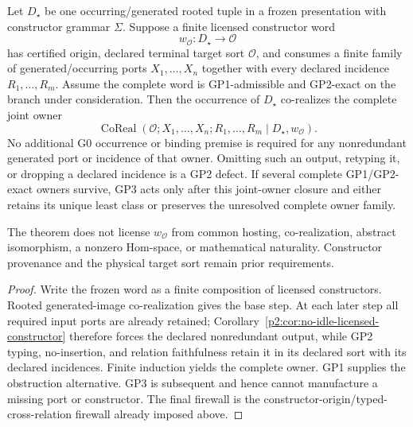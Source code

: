 \documentclass[12pt,a4paper]{article}
\begin{document}
\begin{theorem}
\label{p2a:thm:v183-generated-joint-owner-saturation}
Let $D_\star$ be one occurring/generated rooted tuple in a frozen presentation
with constructor grammar $\Sigma$.  Suppose a finite licensed constructor word
\[
 w_{\mathcal O}:D_\star\longrightarrow\mathcal O
\]
has certified origin, declared terminal target sort $\mathcal O$, and consumes
a finite family of generated/occurring ports $X_1,\ldots,X_n$ together with
every declared incidence $R_1,\ldots,R_m$.  Assume the complete word is
GP1-admissible and GP2-exact on the branch under consideration.  Then the
occurrence of $D_\star$ co-realizes the complete joint owner
\[
 \boxed{\operatorname{CoReal}
 (\mathcal O;X_1,\ldots,X_n;R_1,\ldots,R_m\mid D_\star,w_{\mathcal O}).}
\]
No additional G0 occurrence or binding premise is required for any
nonredundant generated port or incidence of that owner.  Omitting such an
output, retyping it, or dropping a declared incidence is a GP2 defect.  If
several complete GP1/GP2-exact owners survive, GP3 acts only after this
joint-owner closure and either retains its unique least class or preserves the
unresolved complete owner family.

The theorem does not license $w_{\mathcal O}$ from common hosting,
co-realization, abstract isomorphism, a nonzero Hom-space, or mathematical
naturality.  Constructor provenance and the physical target sort remain prior
requirements.
\end{theorem}

\begin{proof}
Write the frozen word as a finite composition of licensed constructors.
Rooted generated-image co-realization gives the base step.  At each later
step all required input ports are already retained; Corollary~\ref{p2:cor:no-idle-licensed-constructor}
therefore forces the declared nonredundant output, while GP2 typing,
no-insertion, and relation faithfulness retain it in its declared sort with
its declared incidences.  Finite induction yields the complete owner.
GP1 supplies the obstruction alternative.  GP3 is subsequent and hence
cannot manufacture a missing port or constructor.  The final firewall is the
constructor-origin/typed-cross-relation firewall already imposed above.
\end{proof}
\end{document}
